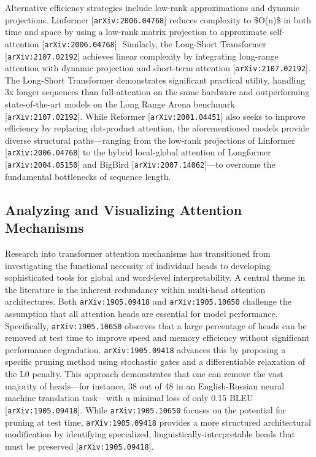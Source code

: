 \documentclass[11pt]{article}
\begin{document}
Alternative efficiency strategies include low-rank approximations and dynamic projections. Linformer [\texttt{arXiv:2006.04768}] reduces complexity to \$O(n)\$ in both time and space by using a low-rank matrix projection to approximate self-attention [\texttt{arXiv:2006.04768}]. Similarly, the Long-Short Transformer [\texttt{arXiv:2107.02192}] achieves linear complexity by integrating long-range attention with dynamic projection and short-term attention [\texttt{arXiv:2107.02192}]. The Long-Short Transformer demonstrates significant practical utility, handling 3x longer sequences than full-attention on the same hardware and outperforming state-of-the-art models on the Long Range Arena benchmark [\texttt{arXiv:2107.02192}]. While Reformer [\texttt{arXiv:2001.04451}] also seeks to improve efficiency by replacing dot-product attention, the aforementioned models provide diverse structural paths—ranging from the low-rank projections of Linformer [\texttt{arXiv:2006.04768}] to the hybrid local-global attention of Longformer [\texttt{arXiv:2004.05150}] and BigBird [\texttt{arXiv:2007.14062}]—to overcome the fundamental bottlenecks of sequence length.

\subsection{Analyzing and Visualizing Attention Mechanisms}

Research into transformer attention mechanisms has transitioned from investigating the functional necessity of individual heads to developing sophisticated tools for global and word-level interpretability. A central theme in the literature is the inherent redundancy within multi-head attention architectures. Both \texttt{arXiv:1905.09418} and \texttt{arXiv:1905.10650} challenge the assumption that all attention heads are essential for model performance. Specifically, \texttt{arXiv:1905.10650} observes that a large percentage of heads can be removed at test time to improve speed and memory efficiency without significant performance degradation. \texttt{arXiv:1905.09418} advances this by proposing a specific pruning method using stochastic gates and a differentiable relaxation of the L0 penalty. This approach demonstrates that one can remove the vast majority of heads—for instance, 38 out of 48 in an English-Russian neural machine translation task—with a minimal loss of only 0.15 BLEU [\texttt{arXiv:1905.09418}]. While \texttt{arXiv:1905.10650} focuses on the potential for pruning at test time, \texttt{arXiv:1905.09418} provides a more structured architectural modification by identifying specialized, linguistically-interpretable heads that must be preserved [\texttt{arXiv:1905.09418}].
\end{document}
